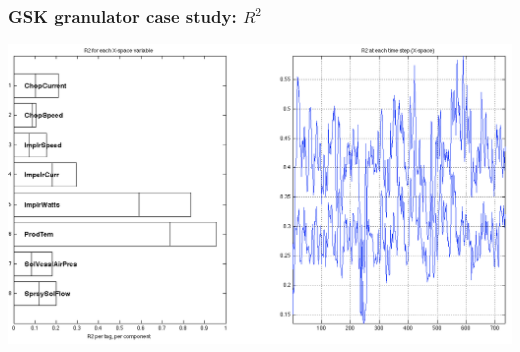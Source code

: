 \begin{frame}\frametitle{GSK granulator case study: \( R^2 \)}

	\begin{center}
		\includegraphics[width=\textwidth]{images/gsk/GSK-R2-plot.png}
	\end{center}

\end{frame}


